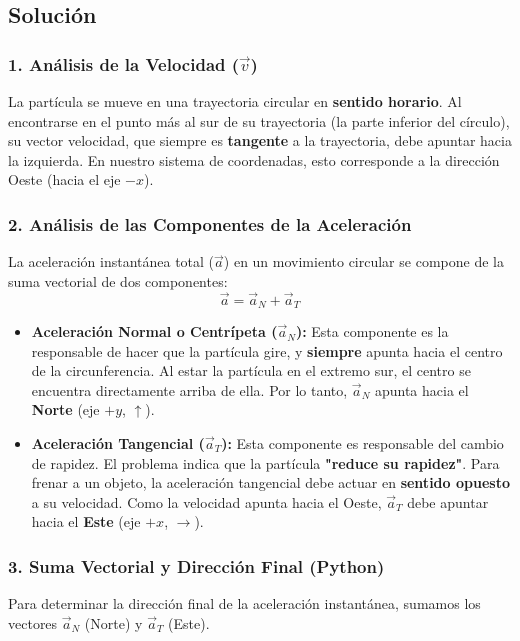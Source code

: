 \documentclass[12pt, a4paper]{article}
\begin{document}
\subsection*{Solución}

\subsubsection*{1. Análisis de la Velocidad ($\vec{v}$)}
La partícula se mueve en una trayectoria circular en \textbf{sentido horario}. Al encontrarse en el punto más al sur de su trayectoria (la parte inferior del círculo), su vector velocidad, que siempre es \textbf{tangente} a la trayectoria, debe apuntar hacia la izquierda. En nuestro sistema de coordenadas, esto corresponde a la dirección Oeste (hacia el eje $-x$).

\subsubsection*{2. Análisis de las Componentes de la Aceleración}
La aceleración instantánea total ($\vec{a}$) en un movimiento circular se compone de la suma vectorial de dos componentes:
$$ \vec{a} = \vec{a}_N + \vec{a}_T $$

\begin{itemize}
    \item \textbf{Aceleración Normal o Centrípeta ($\vec{a}_N$):} Esta componente es la responsable de hacer que la partícula gire, y \textbf{siempre} apunta hacia el centro de la circunferencia. Al estar la partícula en el extremo sur, el centro se encuentra directamente arriba de ella. Por lo tanto, $\vec{a}_N$ apunta hacia el \textbf{Norte} (eje $+y$, $\uparrow$).
    \item \textbf{Aceleración Tangencial ($\vec{a}_T$):} Esta componente es responsable del cambio de rapidez. El problema indica que la partícula \textbf{"reduce su rapidez"}. Para frenar a un objeto, la aceleración tangencial debe actuar en \textbf{sentido opuesto} a su velocidad. Como la velocidad apunta hacia el Oeste, $\vec{a}_T$ debe apuntar hacia el \textbf{Este} (eje $+x$, $\rightarrow$).
\end{itemize}

\subsubsection*{3. Suma Vectorial y Dirección Final (Python)}
Para determinar la dirección final de la aceleración instantánea, sumamos los vectores $\vec{a}_N$ (Norte) y $\vec{a}_T$ (Este).
\end{document}
